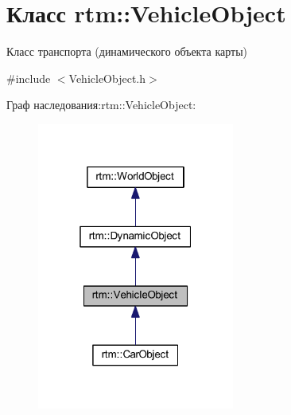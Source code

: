 \hypertarget{classrtm_1_1_vehicle_object}{}\section{Класс rtm\+:\+:Vehicle\+Object}
\label{classrtm_1_1_vehicle_object}


Класс транспорта (динамического объекта карты)  




{\ttfamily \#include $<$Vehicle\+Object.\+h$>$}



Граф наследования\+:rtm\+:\+:Vehicle\+Object\+:
\nopagebreak
\begin{figure}[H]
\begin{center}
\leavevmode
\includegraphics[width=184pt]{classrtm_1_1_vehicle_object__inherit__graph}
\end{center}
\end{figure}
